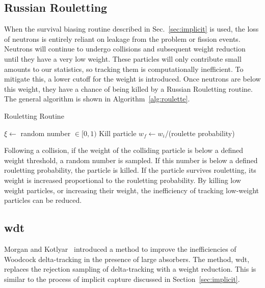 \subsection{Russian Rouletting}
\label{sec:rouletting}

When the survival biasing routine described in Sec.~\ref{sec:implicit}
is used, the loss of neutrons is entirely reliant on leakage from the
problem or fission events. Neutrons will continue to undergo
collisions and subsequent weight reduction until they have a very low
weight. These particles will only contribute small amounts to our
statistics, so tracking them is computationally inefficient.  To
mitigate this, a lower cutoff for the weight is introduced. Once
neutrons are below this weight, they have a chance of being killed by
a Russian Rouletting routine. The general algorithm is shown in
Algorithm~\ref{alg:roulette}.
\begin{algorithm}
\caption{Rouletting Routine}\label{alg:roulette}
\begin{algorithmic}[1]
   \State $\xi \gets $ random number $\in [0,1)$
     \State Kill particle
   \Else
     \State $w_f \gets w_i$/(roulette probability) \label{inc}
   \EndIf
\EndIf
\end{algorithmic}
\end{algorithm}
Following a collision, if the weight of the colliding particle is
below a defined weight threshold, a random number is sampled. If this
number is below a defined rouletting probability, the particle is
killed. If the particle survives rouletting, its weight is increased
proportional to the rouletting probability. By killing low weight
particles, or increasing their weight, the inefficiency of tracking
low-weight particles can be reduced.

\subsection{\Acrlong{wdt}}
\label{sec:wdttheory}

Morgan and Kotlyar~\cite{morgan2015} introduced a method to improve
the inefficiencies of Woodcock delta-tracking in the presence of large
absorbers. The method, \gls{wdt}, replaces the rejection sampling of
delta-tracking with a weight reduction. This is similar to the process
of implicit capture discussed in Section~\ref{sec:implicit}.

